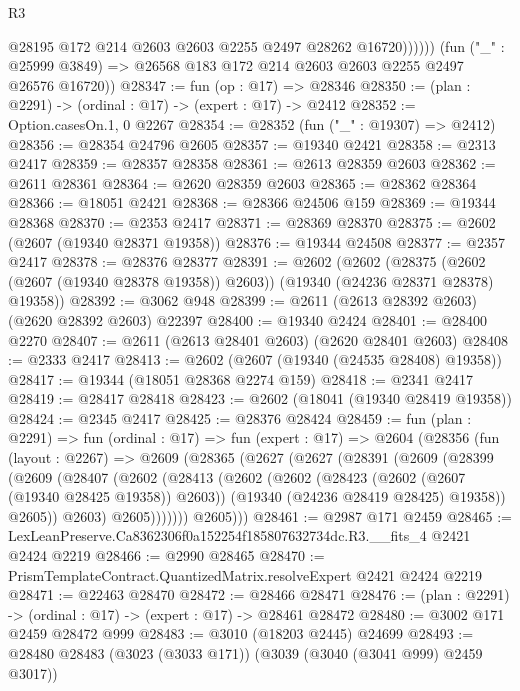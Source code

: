 \begin{lexlean}{R3}
\begin{coremodule}
                @28195 @172 @214 @2603 @2603 @2255 @2497 @28262 @16720))))))
      (fun ("_" : @25999 @3849) => @26568 @183 @172 @214 @2603 @2603 @2255 @2497 @26576 @16720))
@28347 := fun (op : @17) => @28346
@28350 := (plan : @2291) -> (ordinal : @17) -> (expert : @17) -> @2412
@28352 := Option.casesOn.{1, 0} @2267
@28354 := @28352 (fun ("_" : @19307) => @2412)
@28356 := @28354 @24796 @2605
@28357 := @19340 @2421
@28358 := @2313 @2417
@28359 := @28357 @28358
@28361 := @2613 @28359 @2603
@28362 := @2611 @28361
@28364 := @2620 @28359 @2603
@28365 := @28362 @28364
@28366 := @18051 @2421
@28368 := @28366 @24506 @159
@28369 := @19344 @28368
@28370 := @2353 @2417
@28371 := @28369 @28370
@28375 := @2602 (@2607 (@19340 @28371 @19358))
@28376 := @19344 @24508
@28377 := @2357 @2417
@28378 := @28376 @28377
@28391 := @2602
    (@2602
      (@28375 (@2602 (@2607 (@19340 @28378 @19358)) @2603))
      (@19340 (@24236 @28371 @28378) @19358))
@28392 := @3062 @948
@28399 := @2611 (@2613 @28392 @2603) (@2620 @28392 @2603) @22397
@28400 := @19340 @2424
@28401 := @28400 @2270
@28407 := @2611 (@2613 @28401 @2603) (@2620 @28401 @2603)
@28408 := @2333 @2417
@28413 := @2602 (@2607 (@19340 (@24535 @28408) @19358))
@28417 := @19344 (@18051 @28368 @2274 @159)
@28418 := @2341 @2417
@28419 := @28417 @28418
@28423 := @2602 (@18041 (@19340 @28419 @19358))
@28424 := @2345 @2417
@28425 := @28376 @28424
@28459 := fun (plan : @2291) =>
  fun (ordinal : @17) =>
  fun (expert : @17) =>
  @2604
    (@28356
      (fun (layout : @2267) =>
      @2609
        (@28365
          (@2627
            (@2627
              (@28391
                (@2609
                  (@28399
                    (@2609
                      (@28407
                        (@2602
                          (@28413
                            (@2602
                              (@2602
                                (@28423 (@2602 (@2607 (@19340 @28425 @19358)) @2603))
                                (@19340 (@24236 @28419 @28425) @19358))
                              @2605))
                          @2603)
                        @2605)))))))
          @2605)))
@28461 := @2987 @171 @2459
@28465 := LexLeanPreserve.Ca8362306f0a152254f185807632734dc.R3.__fits_4 @2421 @2424 @2219
@28466 := @2990 @28465
@28470 := PrismTemplateContract.QuantizedMatrix.resolveExpert @2421 @2424 @2219
@28471 := @22463 @28470
@28472 := @28466 @28471
@28476 := (plan : @2291) -> (ordinal : @17) -> (expert : @17) -> @28461 @28472
@28480 := @3002 @171 @2459 @28472 @999
@28483 := @3010 (@18203 @2445) @24699
@28493 := @28480 @28483 (@3023 (@3033 @171)) (@3039 (@3040 (@3041 @999) @2459 @3017))

\end{coremodule}
\end{lexlean}
